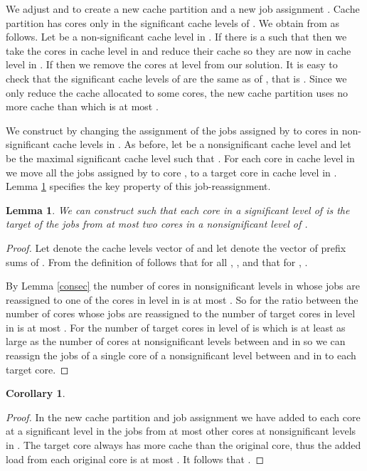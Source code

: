 \documentclass[11pt]{article}
\newtheorem{corollary}[theorem]{Corollary}
\newtheorem{lemma}[theorem]{Lemma}
\begin{document}
 We adjust  and  to create a new cache
partition  and a new job assignment . Cache partition
  has cores only in the significant cache levels 
of . We obtain  from  as follows. Let  be a
non-significant cache level in . If there is a  such that
 then we take the  cores  in cache level  in 
and reduce their cache so they are now in cache level  in . If  then we remove the  cores at level  from our solution.
It is easy to check that the significant cache levels of  are
the same as of , that is  . Since we only reduce the cache allocated to some cores, the new
cache partition  uses no more cache than  which is at most .

We construct  by changing the assignment of the jobs assigned
by  to cores in non-significant cache levels in . As before, let 
be a nonsignificant cache level and let  be the maximal
significant cache level such that . For each core  in
cache level  in  we move all the jobs assigned by  to
core , to a target core in cache level  in . Lemma
\ref{move_jobs_lem} specifies the key property of this
job-reassignment.

\begin{lemma}\label{move_jobs_lem}
We can construct   such that each core  in a significant level
of  is the target of the jobs from at most two cores in a
nonsignificant level of .
\end{lemma}
\begin{proof}
Let  denote the cache levels vector of  and let
 denote the vector of prefix sums of .
From the definition of   follows that for all ,
, and that for ,
.

By Lemma \ref{consec} the number of cores in nonsignificant levels
in  whose jobs are reassigned to one of the 
cores in level  in  is at most . So for  the ratio between the number of cores whose jobs are reassigned
to the number of target cores in level  in  is at most
. For
 the number of target cores in level  of  is
 which is at least as large as the
number of cores at nonsignificant levels between  and  in
 so we can reassign the jobs of a single core of a
nonsignificant level between  and  in  to each target
core.
\end{proof}

\begin{corollary}\label{crl_first_3}

\end{corollary}
\begin{proof}
In the new cache partition  and job assignment  we have
added to each core at a significant level in  the jobs from at
most  other cores at nonsignificant levels in . The target
core always has more cache than the original core, thus the added
load from each original core is at most . It follows that
.
\end{proof}
\end{document}
